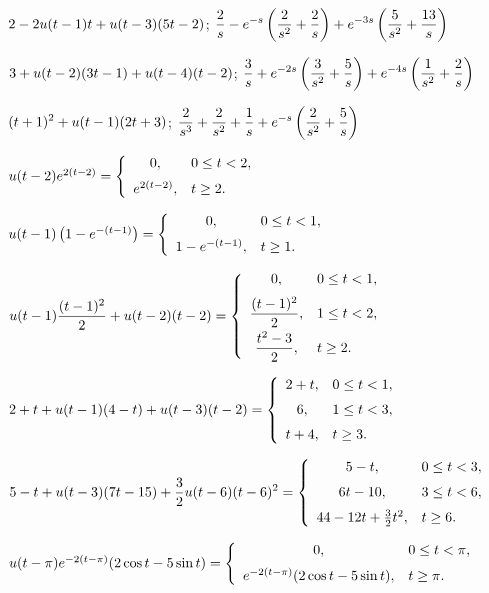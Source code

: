  $\displaystyle{2-2u(t-1)t+u(t-3)(5t-2)}$;\;
$\displaystyle{\frac{2}{s}-e^{-s}\left(\frac{2}{s^{2}}+\frac{2}{s}\right)+e^{-3s}\left(\frac{5}{s^{2}}+\frac{13}{s}\right)}$

 $\displaystyle{3+u(t-2)(3t-1)+u(t-4)(t-2)}$;\;
$\displaystyle{\frac{3}{s}+e^{-2s}\left(\frac{3}{s^{2}}+\frac{5}{s}\right)+e^{-4s}\left(\frac{1}{s^{2}}+\frac{2}{s}\right)}$

 $\displaystyle{(t+1)^{2}+u(t-1)(2t+3)}$;\;
$\displaystyle{\frac{2}{s^{3}}+\frac{2}{s^{2}}+\frac{1}{s}+e^{-s}\left(\frac{2}{s^{2}}+\frac{5}{s}\right)}$

 $u(t-2)e^{2(t-2)}=
\displaystyle{\left\{\begin{array}{cl}0,&0\le t<2,\\[2\jot]
e^{2(t-2)},&t\ge2.\end{array}\right.}$

 $u(t-1)\left(1-e^{-(t-1)}\right)=
\displaystyle{\left\{\begin{array}{cl}0,&0\le t<1,\\[2\jot]
1-e^{-(t-1)},&t\ge1.\end{array}\right.}$

 $\displaystyle{u(t-1)\frac{(t-1)^{2}}{2}+u(t-2)(t-2)}=
\displaystyle{\left\{\begin{array}{cl}0,&0\le t<
1,\\[2\jot]\displaystyle\frac{(t-1)^{2}}{2},&1\le t<2,\\[2\jot]\displaystyle\frac{t^{2}-3}{2},&t\ge2.\end{array}\right.}$

 $2+t+u(t-1)(4-t)+u(t-3)(t-2)=\displaystyle{
\left\{\begin{array}{cl}2+t,&0\le t<1,\\[2\jot]6,&1\le
t<3,\\[2\jot]t+4,&t\ge3.\end{array}\right.}$

 $\displaystyle{5-t+u(t-3)(7t-15)+\frac{3}{2}
u(t-6)(t-6)^{2}}=\displaystyle{\left\{\begin{array}{cl}5-t,&0\le t<3,\\[2\jot]
6t-10,&3\le t<6,\\[2\jot]44-12t+\frac{3}{2}t^{2},&t\ge6.
\end{array}\right.}$

 $u(t-\pi)e^{-2(t-\pi)}(2\cos t-5\sin t)=
\displaystyle{\left\{\begin{array}{cl}0,&0\le t<\pi,\\[2\jot]
e^{-2(t-\pi)}(2\cos t-5\sin t),&t\ge\pi.\end{array}\right.}$

